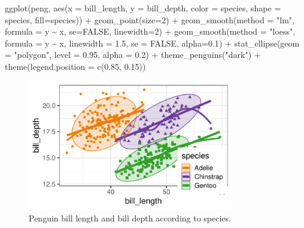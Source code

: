 \documentclass[
  letterpaper,
  10pt,
  krantz2]{krantz}
\makeatletter
\newenvironment{Shaded}{\begin{snugshade}}{\end{snugshade}}
\newcommand{\AttributeTok}[1]{\textcolor[rgb]{0.40,0.45,0.13}{#1}}
\newcommand{\ConstantTok}[1]{\textcolor[rgb]{0.56,0.35,0.01}{#1}}
\newcommand{\DecValTok}[1]{\textcolor[rgb]{0.68,0.00,0.00}{#1}}
\newcommand{\FloatTok}[1]{\textcolor[rgb]{0.68,0.00,0.00}{#1}}
\newcommand{\FunctionTok}[1]{\textcolor[rgb]{0.28,0.35,0.67}{#1}}
\newcommand{\NormalTok}[1]{\textcolor[rgb]{0.00,0.23,0.31}{#1}}
\newcommand{\SpecialCharTok}[1]{\textcolor[rgb]{0.37,0.37,0.37}{#1}}
\newcommand{\StringTok}[1]{\textcolor[rgb]{0.13,0.47,0.30}{#1}}
\newenvironment{kframe}{%
  \medskip{}
  \setlength{\fboxsep}{.8em}
  \def\at@end@of@kframe{}%
  \ifinner\ifhmode%
  \def\at@end@of@kframe{\end{minipage}}%
  \begin{minipage}{\columnwidth}%
  \fi\fi%
  \def\FrameCommand##1{\hskip\@totalleftmargin \hskip-\fboxsep
  \colorbox{shadecolor}{##1}\hskip-\fboxsep
      \hskip-\linewidth \hskip-\@totalleftmargin \hskip\columnwidth}%
  \MakeFramed {\advance\hsize-\width
    \@totalleftmargin\z@ \linewidth\hsize
    \@setminipage}}%
{\par\unskip\endMakeFramed%
  \at@end@of@kframe}
\renewenvironment{Shaded}{\begin{kframe}}{\end{kframe}}
\makeatother
\begin{document}
\begin{Shaded}
\begin{Highlighting}[]
\FunctionTok{ggplot}\NormalTok{(peng, }
       \FunctionTok{aes}\NormalTok{(}\AttributeTok{x =}\NormalTok{ bill\_length, }\AttributeTok{y =}\NormalTok{ bill\_depth,}
           \AttributeTok{color =}\NormalTok{ species, }\AttributeTok{shape =}\NormalTok{ species, }\AttributeTok{fill=}\NormalTok{species)) }\SpecialCharTok{+}
  \FunctionTok{geom\_point}\NormalTok{(}\AttributeTok{size=}\DecValTok{2}\NormalTok{) }\SpecialCharTok{+}
  \FunctionTok{geom\_smooth}\NormalTok{(}\AttributeTok{method =} \StringTok{"lm"}\NormalTok{, }\AttributeTok{formula =}\NormalTok{ y }\SpecialCharTok{\textasciitilde{}}\NormalTok{ x,}
              \AttributeTok{se=}\ConstantTok{FALSE}\NormalTok{, }\AttributeTok{linewidth=}\DecValTok{2}\NormalTok{) }\SpecialCharTok{+}
  \FunctionTok{geom\_smooth}\NormalTok{(}\AttributeTok{method =} \StringTok{"loess"}\NormalTok{,  }\AttributeTok{formula =}\NormalTok{ y }\SpecialCharTok{\textasciitilde{}}\NormalTok{ x,}
              \AttributeTok{linewidth =} \FloatTok{1.5}\NormalTok{, }\AttributeTok{se =} \ConstantTok{FALSE}\NormalTok{, }\AttributeTok{alpha=}\FloatTok{0.1}\NormalTok{) }\SpecialCharTok{+}
  \FunctionTok{stat\_ellipse}\NormalTok{(}\AttributeTok{geom =} \StringTok{"polygon"}\NormalTok{, }\AttributeTok{level =} \FloatTok{0.95}\NormalTok{, }\AttributeTok{alpha =} \FloatTok{0.2}\NormalTok{) }\SpecialCharTok{+}
  \FunctionTok{theme\_penguins}\NormalTok{(}\StringTok{"dark"}\NormalTok{) }\SpecialCharTok{+}
  \FunctionTok{theme}\NormalTok{(}\AttributeTok{legend.position =} \FunctionTok{c}\NormalTok{(}\FloatTok{0.85}\NormalTok{, }\FloatTok{0.15}\NormalTok{))}
\end{Highlighting}
\end{Shaded}

\begin{figure}[H]

{\centering \includegraphics[width=0.8\textwidth,height=\textheight]{figs/ch03/fig-peng-ggplot1-1.pdf}

}

\caption{\label{fig-peng-ggplot1}Penguin bill length and bill depth
according to species.}

\end{figure}
\end{document}
